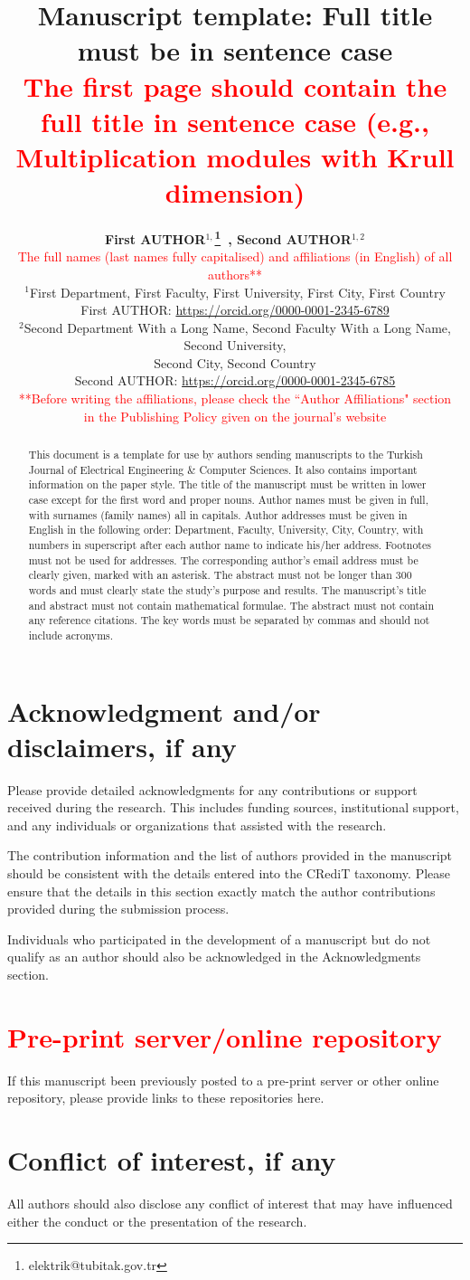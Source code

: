 \documentclass{elektr}
\title{
Manuscript template: Full title must be in sentence case \\
\textcolor{red}{\footnotesize The first page should contain the full title in sentence case (e.g., Multiplication modules with Krull dimension)}
}
\author[AUTHOR and AUTHOR]{
	\textbf{First AUTHOR$^{1,}$\thanks{elektrik@tubitak.gov.tr}~, Second AUTHOR$^{1,2}$}\\
	\textcolor{red}{The full names (last names fully capitalised) and affiliations (in English) of all authors**}\\ 
	$^{1}$First Department, First Faculty, First University, First City, First Country\\ 	First AUTHOR: \url{https://orcid.org/0000-0001-2345-6789} \\
	$^{2}$Second Department With a Long Name, Second Faculty With a Long Name, Second University,\\ Second City, Second Country\\ Second AUTHOR: \url{https://orcid.org/0000-0001-2345-6785}\\
	\textcolor{red}{**Before writing the affiliations, please check the ``Author Affiliations" section}\\ 
	\textcolor{red}{in the Publishing Policy given on the journal’s website}\\ [1.8em]

\rec{...}
\acc{...}
\finv{...}
}
\begin{document}
	\raggedbottom
	
	\maketitle
	
	
	\begin{abstract}
		This document is a template for use by authors sending manuscripts to the Turkish Journal of Electrical Engineering {\&} Computer Sciences. It also contains important information on the paper style. The title of the manuscript must be written in lower case except for the first word and proper nouns. Author names must be given in full, with surnames (family names) all in capitals. Author addresses must be given in English in the following order: Department, Faculty, University, City, Country, with numbers in superscript after each author name to indicate his/her address. Footnotes must not be used for addresses. The corresponding author's email address must be clearly given, marked with an asterisk. The abstract must not be longer than 300 words and must clearly state the study's purpose and results. The manuscript's title and abstract must not contain mathematical formulae. The abstract must not contain any reference citations. The key words must be separated by commas and should not include acronyms.
		
	\end{abstract}
	
\section*{Acknowledgment and/or disclaimers, if any}
Please provide detailed acknowledgments for any contributions or support received during the research. This includes funding sources, institutional support, and any individuals or organizations that assisted with the research. 

The contribution information and the list of authors provided in the manuscript should be consistent with the details entered into the CRediT taxonomy. Please ensure that the details in this section exactly match the author contributions provided during the submission process.

Individuals who participated in the development of a manuscript but do not qualify as an author should also be acknowledged in the Acknowledgments section.

\section*{\textcolor{red}{Pre-print server/online repository}}
If this manuscript been previously posted to a pre-print server or other online repository, please provide links to these repositories here.  

\section*{Conflict of interest, if any}
All authors should also disclose any conflict of interest that may have influenced either the conduct or the presentation of the research.
\end{document}

